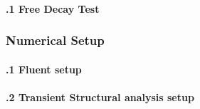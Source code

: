 
\paragraph{\fontsize{11}{12}.1 Free Decay Test}


\subsubsection*{\fontsize{11}{12} Numerical Setup}

\paragraph{\fontsize{11}{12}.1 Fluent setup}


\paragraph{\fontsize{11}{12}.2 Transient Structural analysis setup}

\clearpage
